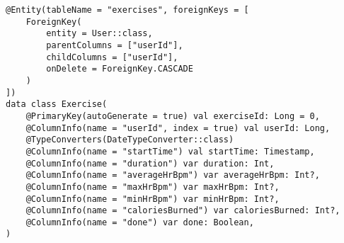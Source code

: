 \begin{lstlisting}[caption={Exercise Entity (Kotlin)}]
@Entity(tableName = "exercises", foreignKeys = [
    ForeignKey(
        entity = User::class,
        parentColumns = ["userId"],
        childColumns = ["userId"],
        onDelete = ForeignKey.CASCADE
    )
])
data class Exercise(
    @PrimaryKey(autoGenerate = true) val exerciseId: Long = 0,
    @ColumnInfo(name = "userId", index = true) val userId: Long,
    @TypeConverters(DateTypeConverter::class)
    @ColumnInfo(name = "startTime") val startTime: Timestamp,
    @ColumnInfo(name = "duration") var duration: Int,
    @ColumnInfo(name = "averageHrBpm") var averageHrBpm: Int?,
    @ColumnInfo(name = "maxHrBpm") var maxHrBpm: Int?,
    @ColumnInfo(name = "minHrBpm") var minHrBpm: Int?,
    @ColumnInfo(name = "caloriesBurned") var caloriesBurned: Int?,
    @ColumnInfo(name = "done") var done: Boolean,
)
\end{lstlisting}
